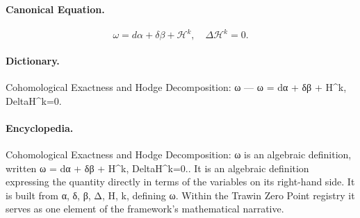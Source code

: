 \paragraph{Canonical Equation.}
\[
\omega = d\alpha + \delta\beta + \mathcal{H}^k,\quad \Delta\mathcal{H}^k=0.
\]

\paragraph{Dictionary.}
Cohomological Exactness and Hodge Decomposition: ω — ω = dα + δβ + H\textasciicircum{}k, DeltaH\textasciicircum{}k=0.

\paragraph{Encyclopedia.}
Cohomological Exactness and Hodge Decomposition: ω is an algebraic definition, written ω = dα + δβ + H\textasciicircum{}k, DeltaH\textasciicircum{}k=0.. It is an algebraic definition expressing the quantity directly in terms of the variables on its right-hand side. It is built from α, δ, β, Δ, H, k, defining ω. Within the Trawin Zero Point registry it serves as one element of the framework's mathematical narrative.
